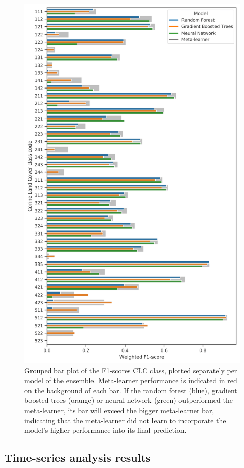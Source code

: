         \begin{figure}[!hp]
        \centering
        \includegraphics[width=0.8\linewidth]{figs_03/results_ensemble_comparison.png}
        \caption{Grouped bar plot of the F1-scores CLC class, plotted separately per model of the ensemble. Meta-learner performance is indicated in red on the background of each bar. If the random forest (blue), gradient boosted trees (orange) or neural network (green) outperformed the meta-learner, its bar will exceed the bigger meta-learner bar, indicating that the meta-learner did not learn to incorporate the model's higher performance into its final prediction.}
        \label{fig:ensemble_comparison}
        \end{figure}
    
\subsection*{Time-series analysis results}

